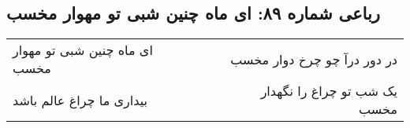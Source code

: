 \begin{center}
\section*{رباعی شماره ۸۹: ای ماه چنین شبی تو مهوار مخسب}
\label{sec:0089}
\begin{longtable}{l p{0.5cm} r}
ای ماه چنین شبی تو مهوار مخسب
&&
در دور درآ چو چرخ دوار مخسب
\\
بیداری ما چراغ عالم باشد
&&
یک شب تو چراغ را نگهدار مخسب
\\
\end{longtable}
\end{center}
